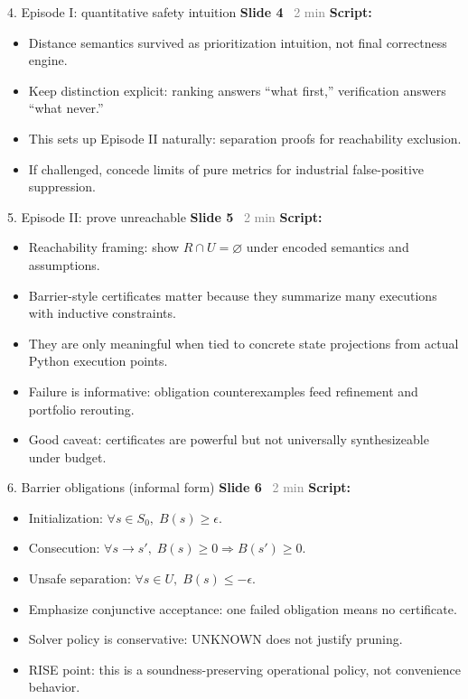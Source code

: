 \documentclass[aspectratio=169]{beamer}
\newcommand{\syncline}[2]{\textbf{#1} \hfill \textcolor{gray}{#2}}
\begin{document}
\begin{frame}{4. Episode I: quantitative safety intuition}
\syncline{Slide 4}{~2 min}
\textbf{Script:}
\begin{itemize}
  \item Distance semantics survived as prioritization intuition, not final correctness engine.
  \item Keep distinction explicit: ranking answers ``what first,'' verification answers ``what never.''
  \item This sets up Episode II naturally: separation proofs for reachability exclusion.
  \item If challenged, concede limits of pure metrics for industrial false-positive suppression.
\end{itemize}
\end{frame}

\begin{frame}{5. Episode II: prove unreachable}
\syncline{Slide 5}{~2 min}
\textbf{Script:}
\begin{itemize}
  \item Reachability framing: show \(R\cap U=\varnothing\) under encoded semantics and assumptions.
  \item Barrier-style certificates matter because they summarize many executions with inductive constraints.
  \item They are only meaningful when tied to concrete state projections from actual Python execution points.
  \item Failure is informative: obligation counterexamples feed refinement and portfolio rerouting.
  \item Good caveat: certificates are powerful but not universally synthesizeable under budget.
\end{itemize}
\end{frame}

\begin{frame}{6. Barrier obligations (informal form)}
\syncline{Slide 6}{~2 min}
\textbf{Script:}
\begin{itemize}
  \item Initialization: \(\forall s\in S_0,\;B(s)\ge\epsilon\).
  \item Consecution: \(\forall s\to s',\;B(s)\ge0\Rightarrow B(s')\ge0\).
  \item Unsafe separation: \(\forall s\in U,\;B(s)\le-\epsilon\).
  \item Emphasize conjunctive acceptance: one failed obligation means no certificate.
  \item Solver policy is conservative: UNKNOWN does not justify pruning.
  \item RISE point: this is a soundness-preserving operational policy, not convenience behavior.
\end{itemize}
\end{frame}
\end{document}
